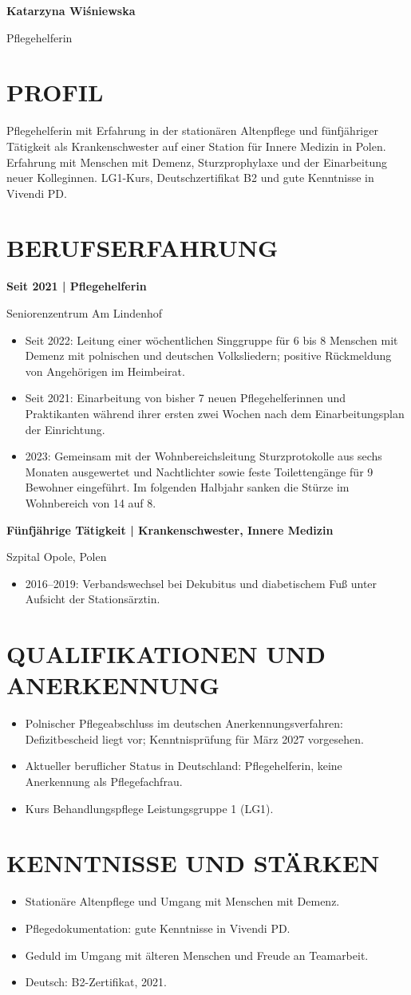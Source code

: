 \documentclass[11pt,a4paper]{article}
\newcommand{\cvsection}[1]{\section*{#1}}
\begin{document}
{\LARGE\bfseries\color{primarycolor} Katarzyna Wiśniewska}\par
{\large\color{accentcolor} Pflegehelferin}\par
\cvsection{PROFIL}
Pflegehelferin mit Erfahrung in der stationären Altenpflege und fünfjähriger Tätigkeit als Krankenschwester auf einer Station für Innere Medizin in Polen. Erfahrung mit Menschen mit Demenz, Sturzprophylaxe und der Einarbeitung neuer Kolleginnen. LG1-Kurs, Deutschzertifikat B2 und gute Kenntnisse in Vivendi PD.
\cvsection{BERUFSERFAHRUNG}
\textbf{Seit 2021 | Pflegehelferin}\par
Seniorenzentrum Am Lindenhof
\begin{itemize}
\item Seit 2022: Leitung einer wöchentlichen Singgruppe für 6 bis 8 Menschen mit Demenz mit polnischen und deutschen Volksliedern; positive Rückmeldung von Angehörigen im Heimbeirat.
\item Seit 2021: Einarbeitung von bisher 7 neuen Pflegehelferinnen und Praktikanten während ihrer ersten zwei Wochen nach dem Einarbeitungsplan der Einrichtung.
\item 2023: Gemeinsam mit der Wohnbereichsleitung Sturzprotokolle aus sechs Monaten ausgewertet und Nachtlichter sowie feste Toilettengänge für 9 Bewohner eingeführt. Im folgenden Halbjahr sanken die Stürze im Wohnbereich von 14 auf 8.
\end{itemize}
\textbf{Fünfjährige Tätigkeit | Krankenschwester, Innere Medizin}\par
Szpital Opole, Polen
\begin{itemize}
\item 2016–2019: Verbandswechsel bei Dekubitus und diabetischem Fuß unter Aufsicht der Stationsärztin.
\end{itemize}
\cvsection{QUALIFIKATIONEN UND ANERKENNUNG}
\begin{itemize}
\item Polnischer Pflegeabschluss im deutschen Anerkennungsverfahren: Defizitbescheid liegt vor; Kenntnisprüfung für März 2027 vorgesehen.
\item Aktueller beruflicher Status in Deutschland: Pflegehelferin, keine Anerkennung als Pflegefachfrau.
\item Kurs Behandlungspflege Leistungsgruppe 1 (LG1).
\end{itemize}
\cvsection{KENNTNISSE UND STÄRKEN}
\begin{itemize}
\item Stationäre Altenpflege und Umgang mit Menschen mit Demenz.
\item Pflegedokumentation: gute Kenntnisse in Vivendi PD.
\item Geduld im Umgang mit älteren Menschen und Freude an Teamarbeit.
\item Deutsch: B2-Zertifikat, 2021.
\end{itemize}
\end{document}
